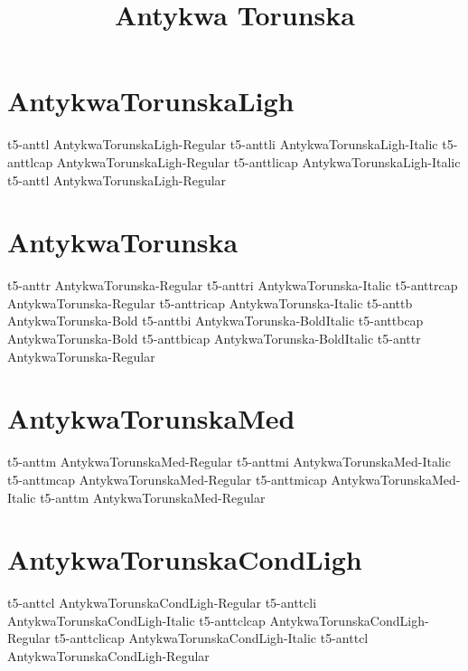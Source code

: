 \documentclass[sample]{vnsample}
\title{Antykwa Torunska}
\begin{document}
\section{AntykwaTorunskaLigh}
      {t5-anttl}      {AntykwaTorunskaLigh-Regular}
     {t5-anttli}     {AntykwaTorunskaLigh-Italic}
     {t5-anttlcap}   {AntykwaTorunskaLigh-Regular}
   {t5-anttlicap}  {AntykwaTorunskaLigh-Italic}
      {t5-anttl}      {AntykwaTorunskaLigh-Regular}

\section{AntykwaTorunska}
      {t5-anttr}      {AntykwaTorunska-Regular}
     {t5-anttri}     {AntykwaTorunska-Italic}
     {t5-anttrcap}   {AntykwaTorunska-Regular}
   {t5-anttricap}  {AntykwaTorunska-Italic}
      {t5-anttb}      {AntykwaTorunska-Bold}
     {t5-anttbi}     {AntykwaTorunska-BoldItalic}
     {t5-anttbcap}   {AntykwaTorunska-Bold}
   {t5-anttbicap}  {AntykwaTorunska-BoldItalic}
      {t5-anttr}      {AntykwaTorunska-Regular}

\section{AntykwaTorunskaMed}
     {t5-anttm}      {AntykwaTorunskaMed-Regular}
    {t5-anttmi}     {AntykwaTorunskaMed-Italic}
    {t5-anttmcap}   {AntykwaTorunskaMed-Regular}
  {t5-anttmicap}  {AntykwaTorunskaMed-Italic}
     {t5-anttm}      {AntykwaTorunskaMed-Regular}

\section{AntykwaTorunskaCondLigh}
     {t5-anttcl}     {AntykwaTorunskaCondLigh-Regular}
    {t5-anttcli}    {AntykwaTorunskaCondLigh-Italic}
    {t5-anttclcap}  {AntykwaTorunskaCondLigh-Regular}
  {t5-anttclicap} {AntykwaTorunskaCondLigh-Italic}
     {t5-anttcl}     {AntykwaTorunskaCondLigh-Regular}
\end{document}
